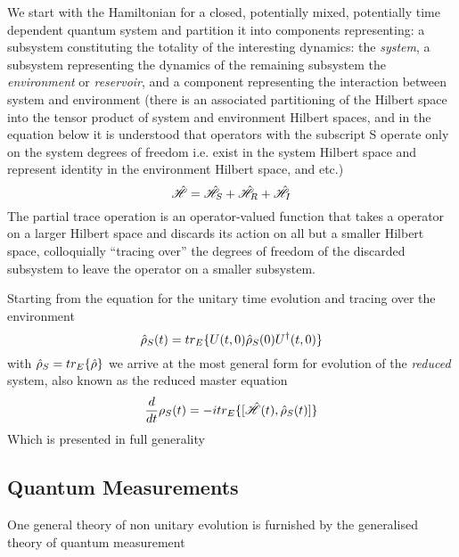 We start with the Hamiltonian for a closed, potentially mixed, potentially time dependent quantum system and partition it into components representing: a subsystem constituting the totality of the interesting dynamics: the \emph{system}, a subsystem representing the dynamics of the remaining subsystem the \emph{environment} or \emph{reservoir}, and a component representing the interaction between system and environment (there is an associated partitioning of the Hilbert space into the tensor product of system and environment Hilbert spaces, and in the equation below it is understood that operators with the subscript S operate only on the system degrees of freedom i.e. exist in the system Hilbert space and represent identity in the environment Hilbert space, and etc.)
\begin{equation}
	\hat{\mathscr{H}} = \hat{\mathscr{H}}_S +\hat{\mathscr{H}}_R + \hat{\mathscr{H}}_I
\end{equation}
The partial trace operation is an operator-valued function that takes a operator on a larger Hilbert space and discards its action on all but a smaller Hilbert space, colloquially ``tracing over'' the degrees of freedom of the discarded subsystem to leave the operator on a smaller subsystem.

Starting from the equation for the unitary time evolution and tracing over the environment
\begin{equation}
	\hat{\rho}_S (t) = tr_E \{U(t, 0) \hat{\rho}_S (0) U^\dagger (t, 0) \}
\end{equation}
with $\hat{\rho}_S = tr_E\{\hat{\rho} \}$ we arrive at the most general form for evolution of the \emph{reduced} system, also known as the reduced master equation
\begin{equation}
	\frac{d}{dt} \rho_S (t) = -itr_E\{[\hat{\mathscr{H}}(t), \hat{\rho}_S(t)]\}
\end{equation}
Which is presented in full generality
\subsection{Quantum Measurements}
One general theory of non unitary evolution is furnished by the generalised theory of quantum measurement \cite{Wiseman2010a}
